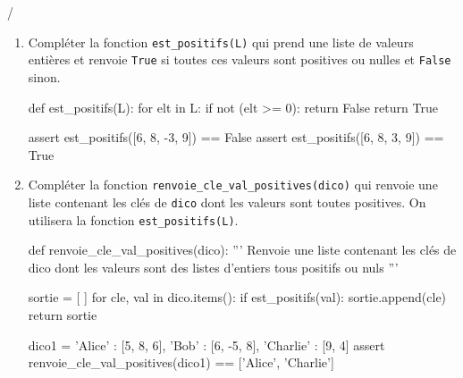 \documentclass[a4paper]{article}
\begin{document}
\begin{exerciceinterro}{\hspace{2cm}\dotfill/}{}

\begin{enumerate}
	\item Compléter la fonction \verb+est_positifs(L)+ qui prend une liste de valeurs entières et renvoie \verb+True+ si toutes ces valeurs sont positives ou nulles et \verb+False+ sinon.
	
\begin{CodePythontexAlt}[Largeur=17cm,
TaillePolice = \normalsize, 
EspacementVertical = 1.2,
Lignes=false]{}
def est_positifs(L):
    for elt in L:
    		if not (elt >= 0):
    			return False
    	return True    
	
assert est_positifs([6, 8, -3, 9]) == False
assert est_positifs([6, 8, 3, 9]) == True
\end{CodePythontexAlt}
	

\item Compléter la fonction \verb+renvoie_cle_val_positives(dico)+ qui renvoie une liste contenant les clés de \verb+dico+ dont les valeurs sont toutes positives. On utilisera la fonction \verb+est_positifs(L)+.

\begin{CodePythontexAlt}[Largeur=17cm,
TaillePolice = \normalsize, 
EspacementVertical = 1.2,
Lignes=false]{}
def renvoie_cle_val_positives(dico):
	''' Renvoie une liste contenant les clés de dico dont 
	les valeurs sont des listes d'entiers tous positifs ou nuls '''
	
	sortie = [ ]	
	for cle, val in dico.items():
		if est_positifs(val):
			sortie.append(cle)
	return sortie	
	
dico1 = {'Alice' : [5, 8, 6], 'Bob' : [6, -5, 8], 'Charlie' : [9, 4]}	
assert renvoie_cle_val_positives(dico1) == ['Alice', 'Charlie']
\end{CodePythontexAlt}
\end{enumerate}

\end{exerciceinterro}
\end{document}
